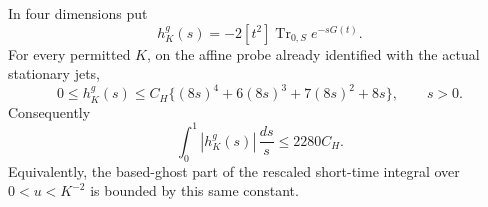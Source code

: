 \begin{proposition}
\label{ahc-ghost-short}
In four dimensions put
\[
 h^g_K(s)=-2[t^2]\operatorname{Tr}_{0,S}e^{-sG(t)}.
\]
For every permitted \(K\), on the affine probe already
identified with the actual stationary jets,
\begin{equation}
 0\le h^g_K(s)\le C_H\{(8s)^4+6(8s)^3+7(8s)^2+8s\},
                     \qquad s>0.
 \label{ahc-ghost-poisson}
\end{equation}
Consequently
\begin{equation}
 \int_0^1 |h^g_K(s)|\,\frac{ds}{s}\le2280C_H.
 \label{ahc-ghost-uv}
\end{equation}
Equivalently, the based-ghost part of the rescaled
short-time integral over \(0<u<K^{-2}\) is bounded
by this same constant.
\end{proposition}


